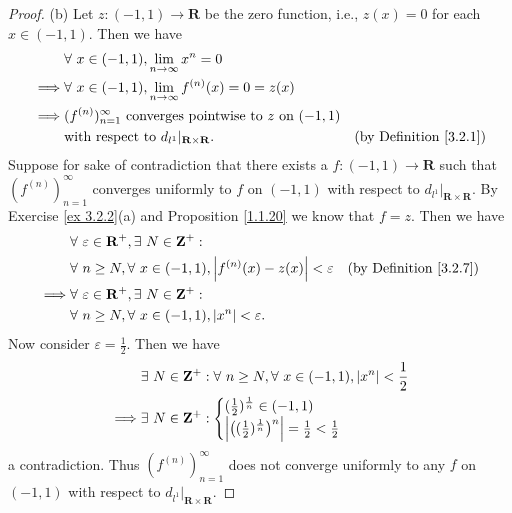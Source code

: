\begin{proof}{(b)}
    Let \(z : (-1, 1) \to \mathbf{R}\) be the zero function, i.e., \(z(x) = 0\) for each \(x \in (-1, 1)\).
    Then we have
    \begin{align*}
                 & \forall\ x \in (-1, 1), \lim_{n \to \infty} x^n = 0                                                                 \\
        \implies & \forall\ x \in (-1, 1), \lim_{n \to \infty} f^{(n)}(x) = 0 = z(x)                                                   \\
        \implies & (f^{(n)})_{n = 1}^\infty \text{ converges pointwise to } z \text{ on } (-1, 1)                                      \\
                 & \text{with respect to } d_{l^1}|_{\mathbf{R} \times \mathbf{R}}.               & \text{(by Definition \ref{3.2.1})}
    \end{align*}
    Suppose for sake of contradiction that there exists a \(f : (-1, 1) \to \mathbf{R}\) such that \((f^{(n)})_{n = 1}^\infty\) converges uniformly to \(f\) on \((-1, 1)\) with respect to \(d_{l^1}|_{\mathbf{R} \times \mathbf{R}}\).
    By Exercise \ref{ex 3.2.2}(a) and Proposition \ref{1.1.20} we know that \(f = z\).
    Then we have
    \begin{align*}
                 & \forall\ \varepsilon \in \mathbf{R}^+, \exists\ N \in \mathbf{Z}^+ :                                                   \\
                 & \forall\ n \geq N, \forall\ x \in (-1, 1), \abs*{f^{(n)}(x) - z(x)} < \varepsilon & \text{(by Definition \ref{3.2.7})} \\
        \implies & \forall\ \varepsilon \in \mathbf{R}^+, \exists\ N \in \mathbf{Z}^+ :                                                   \\
                 & \forall\ n \geq N, \forall\ x \in (-1, 1), \abs*{x^n} < \varepsilon.
    \end{align*}
    Now consider \(\varepsilon = \frac{1}{2}\).
    Then we have
    \begin{align*}
                 & \exists\ N \in \mathbf{Z}^+ : \forall\ n \geq N, \forall\ x \in (-1, 1), \abs*{x^n} < \frac{1}{2} \\
        \implies & \exists\ N \in \mathbf{Z}^+ : \begin{cases}
            (\frac{1}{2})^{\frac{1}{n}} \in (-1, 1) \\
            \abs*{\big((\frac{1}{2})^{\frac{1}{n}}\big)^n} = \frac{1}{2} < \frac{1}{2}
        \end{cases}
    \end{align*}
    a contradiction.
    Thus \((f^{(n)})_{n = 1}^\infty\) does not converge uniformly to any \(f\) on \((-1, 1)\) with respect to \(d_{l^1}|_{\mathbf{R} \times \mathbf{R}}\).
\end{proof}

